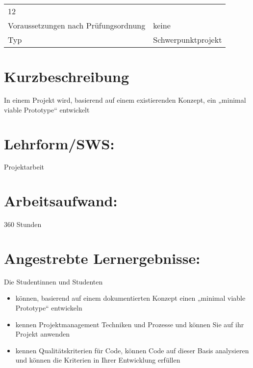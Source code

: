 \begin{longtable}[]{@{}ll@{}}
\begin{minipage}[t]{0.12\columnwidth}
12\strut
\end{minipage}\tabularnewline
\begin{minipage}[t]{0.12\columnwidth}\raggedright\strut
Voraussetzungen nach Prüfungsordnung\strut
\end{minipage} & \begin{minipage}[t]{0.12\columnwidth}\raggedright\strut
keine\strut
\end{minipage}\tabularnewline
\begin{minipage}[t]{0.12\columnwidth}\raggedright\strut
Typ\strut
\end{minipage} & \begin{minipage}[t]{0.12\columnwidth}\raggedright\strut
Schwerpunktprojekt\strut
\end{minipage}\tabularnewline
\bottomrule
\end{longtable}

\section*{Kurzbeschreibung}\label{kurzbeschreibung-2}

In einem Projekt wird, basierend auf einem existierenden Konzept, ein
„minimal viable Prototype`` entwickelt

\section*{Lehrform/SWS:}\label{lehrformsws-8}

Projektarbeit

\section*{Arbeitsaufwand:}\label{arbeitsaufwand-14}

360 Stunden

\section*{Angestrebte
Lernergebnisse:}\label{angestrebte-lernergebnisse-8}

Die Studentinnen und Studenten

\begin{itemize}
\item
  können, basierend auf einem dokumentierten Konzept einen „minimal
  viable Prototype`` entwickeln
\item
  kennen Projektmanagement Techniken und Prozesse und können Sie auf ihr
  Projekt anwenden
\item
  kennen Qualitätskriterien für Code, können Code auf dieser Basis
  analysieren und können die Kriterien in Ihrer Entwicklung erfüllen
\end{itemize}

